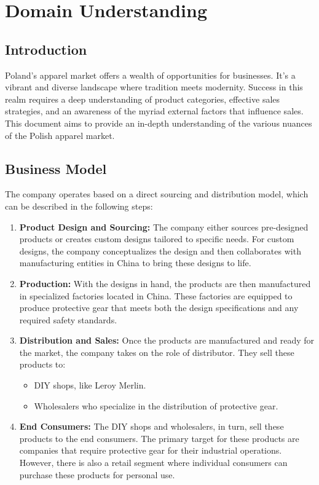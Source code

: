 \documentclass{article}
\begin{document}
\section{Domain Understanding}

\subsection{Introduction}
Poland's apparel market offers a wealth of opportunities for businesses. It's a vibrant and diverse landscape where tradition meets modernity. Success in this realm requires a deep understanding of product categories, effective sales strategies, and an awareness of the myriad external factors that influence sales. This document aims to provide an in-depth understanding of the various nuances of the Polish apparel market.

\subsection{Business Model}

The company operates based on a direct sourcing and distribution model, which can be described in the following steps:

\begin{enumerate}
    \item \textbf{Product Design and Sourcing:} 
    The company either sources pre-designed products or creates custom designs tailored to specific needs. For custom designs, the company conceptualizes the design and then collaborates with manufacturing entities in China to bring these designs to life.

    \item \textbf{Production:} 
    With the designs in hand, the products are then manufactured in specialized factories located in China. These factories are equipped to produce protective gear that meets both the design specifications and any required safety standards.

    \item \textbf{Distribution and Sales:} 
    Once the products are manufactured and ready for the market, the company takes on the role of distributor. They sell these products to:
    \begin{itemize}
        \item DIY shops, like Leroy Merlin.
        \item Wholesalers who specialize in the distribution of protective gear.
    \end{itemize}

    \item \textbf{End Consumers:} 
    The DIY shops and wholesalers, in turn, sell these products to the end consumers. The primary target for these products are companies that require protective gear for their industrial operations. However, there is also a retail segment where individual consumers can purchase these products for personal use.
\end{enumerate}
\end{document}
